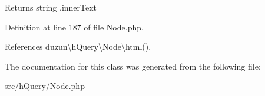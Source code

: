 \begin{DoxyReturn}{Returns}
string .inner\+Text 
\end{DoxyReturn}


Definition at line 187 of file Node.\+php.



References duzun\textbackslash{}h\+Query\textbackslash{}\+Node\textbackslash{}html().



The documentation for this class was generated from the following file\+:\begin{DoxyCompactItemize}
\item 
src/h\+Query/Node.\+php\end{DoxyCompactItemize}
